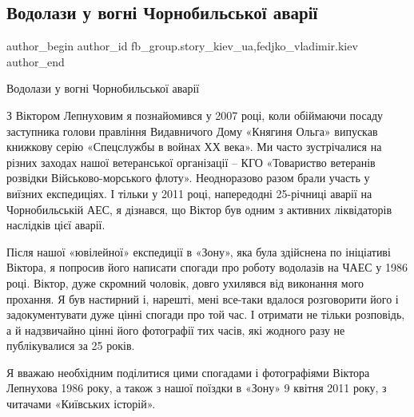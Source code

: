  
 
 
 
 
 
\subsection{Водолази у вогні Чорнобильської аварії}
\label{sec:02_12_2021.fb.fb_group.story_kiev_ua.1.vodolazy_chernobyl}
 
\ifcmt
 author_begin
   author_id fb_group.story_kiev_ua,fedjko_vladimir.kiev
 author_end
\fi

Водолази у вогні Чорнобильської аварії

З Віктором Лепнуховим я познайомився у 2007 році, коли обіймаючи посаду
заступника голови правління Видавничого Дому «Княгиня Ольга» випускав книжкову
серію «Спецслужбы в войнах ХХ века». Ми часто зустрічалися на різних заходах
нашої ветеранської організації – КГО «Товариство ветеранів розвідки
Військово-морського флоту». Неодноразово разом брали участь у виїзних
експедиціях. І тільки у 2011 році, напередодні 25-річниці аварії на
Чорнобильській АЕС, я дізнався, що Віктор був одним з активних ліквідаторів
наслідків цієї аварії. 

Після нашої «ювілейної» експедиції в «Зону», яка була здійснена по ініціативі
Віктора, я попросив його написати спогади про роботу водолазів на ЧАЕС у 1986
році. Віктор, дуже скромний чоловік, довго ухилявся від виконання мого
прохання. Я був настирний і, нарешті, мені все-таки вдалося розговорити його і
задокументувати дуже цінні спогади про той час. І отримати не тільки розповідь,
а й надзвичайно цінні його фотографії тих часів, які жодного разу не
публікувалися за 25 років.


Я вважаю необхідним поділитися цими спогадами і фотографіями Віктора Лепнухова
1986 року, а також з нашої поїздки в «Зону» 9 квітня 2011 року, з читачами
«Київських історій».

